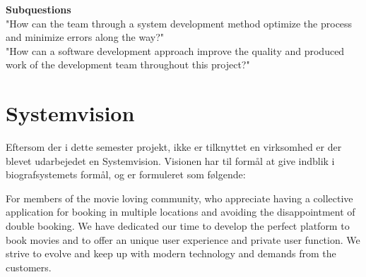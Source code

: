 \textbf{Subquestions} \\
"How can the team through a system development method optimize the process and minimize errors along the way?" \\

"How can a software development approach improve the quality and produced work of the development team throughout this project?"\\

\section{Systemvision}
Eftersom der i dette semester projekt, ikke er tilknyttet en virksomhed er der blevet udarbejedet en Systemvision. 
Visionen har til formål at give indblik i biografsystemets formål, og er formuleret som følgende:

For members of the movie loving community, who appreciate having a collective application for booking 
in multiple locations and avoiding the disappointment of double booking. We have dedicated our 
time to develop the perfect platform to book movies and to offer an unique user experience and private user function. 
We strive to evolve and keep up with modern technology and demands from the customers. \\
















